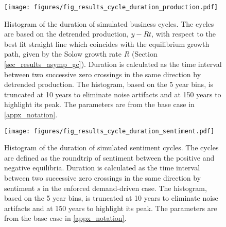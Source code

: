 \documentclass[authoryear, review]{elsarticle}
\begin{document}
\begin{figure}[htpb!]
    \centering
    \texttt{[image: figures/fig\_results\_cycle\_duration\_production.pdf]}
    \caption{Histogram of the duration of simulated business cycles. The cycles are based on the detrended production, $y-Rt$, with respect to the best fit straight line which coincides with the equilibrium growth path, given by the Solow growth rate $R$ (Section \ref{sec_results_asymp_gc}). Duration is calculated as the time interval between two successive zero crossings in the same direction by detrended production. The histogram, based on the 5 year bins, is truncated at 10 years to eliminate noise artifacts and at 150 years to highlight its peak. The parameters are from the base case in \ref{appx_notation}. %
    }
    \label{fig_results_cycle_duration_production}
\end{figure}

\begin{figure}[htpb!]
    \centering
    \texttt{[image: figures/fig\_results\_cycle\_duration\_sentiment.pdf]}
    \caption{Histogram of the duration of simulated sentiment cycles. The cycles are defined as the roundtrip of sentiment between the positive and negative equilibria. Duration is calculated as the time interval between two successive zero crossings in the same direction by sentiment $s$ in the enforced demand-driven case. The histogram, based on the 5 year bins, is truncated at 10 years to eliminate noise artifacts and at 150 years to highlight its peak. The parameters are from the base case in \ref{appx_notation}. %
    }
    \label{fig_results_cycle_duration_sentiment}
\end{figure}

\end{document}
